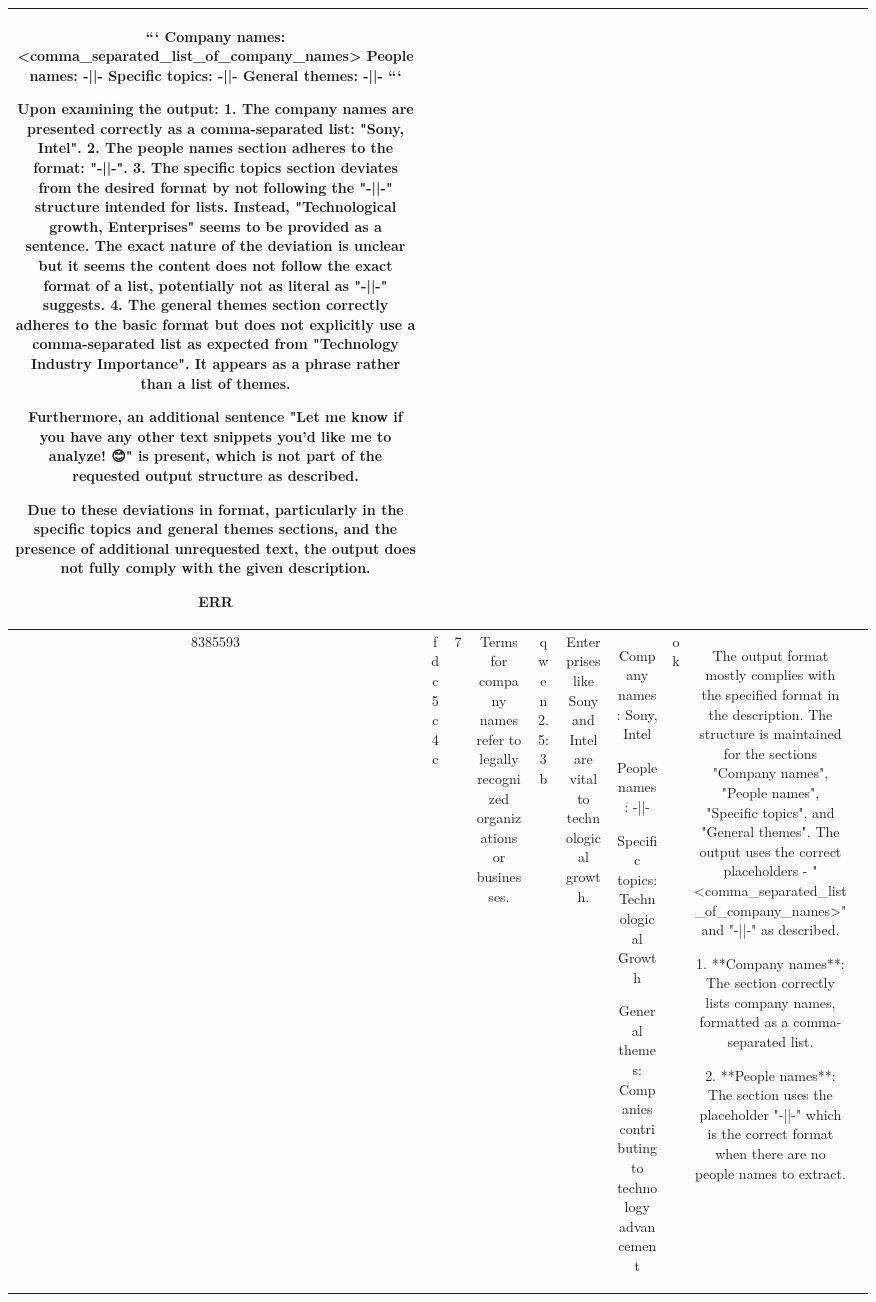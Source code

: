 \begin{table}[h!]
\begin{tabular}{|c|c|c|c|c|c|c|c|c|c|}
```
Company names: <comma_separated_list_of_company_names>
People names: -||-
Specific topics: -||-
General themes: -||-
```

Upon examining the output:
1. The company names are presented correctly as a comma-separated list: "Sony, Intel".
2. The people names section adheres to the format: "-||-".
3. The specific topics section deviates from the desired format by not following the "-||-" structure intended for lists. Instead, "Technological growth, Enterprises" seems to be provided as a sentence. The exact nature of the deviation is unclear but it seems the content does not follow the exact format of a list, potentially not as literal as "-||-" suggests.
4. The general themes section correctly adheres to the basic format but does not explicitly use a comma-separated list as expected from "Technology Industry Importance". It appears as a phrase rather than a list of themes.

Furthermore, an additional sentence "Let me know if you have any other text snippets you'd like me to analyze! 😊" is present, which is not part of the requested output structure as described.

Due to these deviations in format, particularly in the specific topics and general themes sections, and the presence of additional unrequested text, the output does not fully comply with the given description.

ERR & \\
\hline
8385593 & fdc5c4c & 7 & Terms for company names refer to legally recognized organizations or businesses. & qwen2.5:3b & Enterprises like Sony and Intel are vital to technological growth. & Company names: Sony, Intel

People names: -||-

Specific topics: Technological Growth

General themes: Companies contributing to technology advancement & ok & The output format mostly complies with the specified format in the description. The structure is maintained for the sections "Company names", "People names", "Specific topics", and "General themes". The output uses the correct placeholders - "<comma_separated_list_of_company_names>" and "-||-" as described.

1. **Company names**: The section correctly lists company names, formatted as a comma-separated list.

2. **People names**: The section uses the placeholder "-||-" which is the correct format when there are no people names to extract.


\end{tabular}
\end{table}
